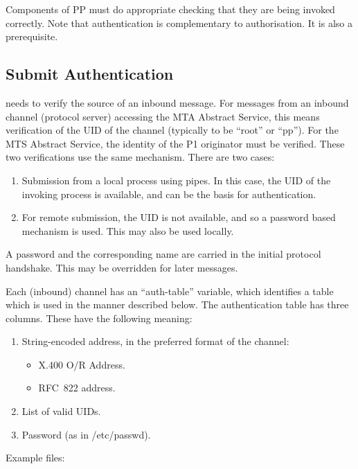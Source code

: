 Components of PP must do appropriate checking that they are being
invoked correctly.  Note that authentication is complementary to
authorisation.  It is also a prerequisite.

\subsection {Submit Authentication}

 needs to verify the source of an inbound message.  For messages from
an inbound channel (protocol server) accessing the MTA Abstract Service, this
means verification of the UID of the channel (typically to be ``root'' or
``pp'').  For the MTS Abstract Service, the identity of the P1 originator must
be verified.  These two verifications use the same mechanism.  There are two
cases:

\begin {enumerate}
\item Submission from a local process using pipes.  In this case, the UID of
the invoking process is available, and can be the basis for authentication.

\item For remote submission, the UID is not available, and so a password
based mechanism is used.   This may also be used locally.
\end {enumerate}

A password and the corresponding name are carried in the initial protocol
handshake.  This may be overridden for later messages.

Each (inbound) channel has an ``auth-table'' variable, which
identifies a table which is used in the manner described below.  The
authentication table has three columns.  These have the following meaning:

\begin {enumerate}
\item String-encoded address, in the preferred format of the channel:
\begin {itemize}
\item X.400 O/R Address.
\item RFC~822 address.
\end {itemize}

\item List of valid UIDs.

\item Password (as in /etc/passwd).
\end {enumerate}

Example files:

